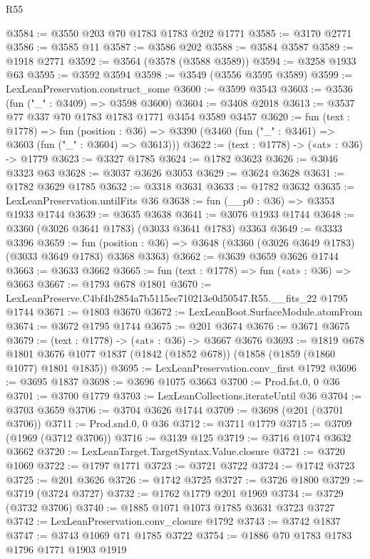 \begin{lexlean}{R55}
\begin{coremodule}
@3584 := @3550 @203 @70 @1783 @1783 @202 @1771
@3585 := @3170 @2771
@3586 := @3585 @11
@3587 := @3586 @202
@3588 := @3584 @3587
@3589 := @1918 @2771
@3592 := @3564 (@3578 (@3588 @3589))
@3594 := @3258 @1933 @63
@3595 := @3592 @3594
@3598 := @3549 (@3556 @3595 @3589)
@3599 := LexLeanPreservation.construct_some
@3600 := @3599 @3543
@3603 := @3536 (fun ("_" : @3409) => @3598 @3600)
@3604 := @3408 @2018
@3613 := @3537 @77 @337 @70 @1783 @1783 @1771 @3454 @3589 @3457
@3620 := fun (text : @1778) =>
  fun (position : @36) => @3390 (@3460 (fun ("_" : @3461) => @3603 (fun ("_" : @3604) => @3613)))
@3622 := (text : @1778) -> («at» : @36) -> @1779
@3623 := @3327 @1785
@3624 := @1782 @3623
@3626 := @3046 @3323 @63
@3628 := @3037 @3626 @3053
@3629 := @3624 @3628
@3631 := @1782 @3629 @1785
@3632 := @3318 @3631
@3633 := @1782 @3632
@3635 := LexLeanPreservation.untilFits @36
@3638 := fun (__p0 : @36) => @3353 @1933 @1744
@3639 := @3635 @3638
@3641 := @3076 @1933 @1744
@3648 := @3360 (@3026 @3641 @1783) (@3033 @3641 @1783) @3363
@3649 := @3333 @3396
@3659 := fun (position : @36) => @3648 (@3360 (@3026 @3649 @1783) (@3033 @3649 @1783) @3368 @3363)
@3662 := @3639 @3659 @3626 @1744
@3663 := @3633 @3662
@3665 := fun (text : @1778) => fun («at» : @36) => @3663
@3667 := @1793 @678 @1801
@3670 := LexLeanPreserve.C4bf4b2854a7b5115ec710213e0d50547.R55.__fits_22 @1795 @1744
@3671 := @1803 @3670
@3672 := LexLeanBoot.SurfaceModule.atomFrom
@3674 := @3672 @1795 @1744
@3675 := @201 @3674
@3676 := @3671 @3675
@3679 := (text : @1778) -> («at» : @36) -> @3667 @3676
@3693 := @1819
    @678
    @1801
    @3676
    @1077
    @1837
    (@1842 (@1852 @678))
    (@1858 (@1859 (@1860 @1077) @1801 @1835))
@3695 := LexLeanPreservation.conv_first @1792
@3696 := @3695 @1837
@3698 := @3696 @1075 @3663
@3700 := Prod.fst.{0, 0} @36
@3701 := @3700 @1779
@3703 := LexLeanCollections.iterateUntil @36
@3704 := @3703 @3659
@3706 := @3704 @3626 @1744
@3709 := @3698 (@201 (@3701 @3706))
@3711 := Prod.snd.{0, 0} @36
@3712 := @3711 @1779
@3715 := @3709 (@1969 (@3712 @3706))
@3716 := @3139 @125
@3719 := @3716 @1074 @3632 @3662
@3720 := LexLeanTarget.TargetSyntax.Value.closure
@3721 := @3720 @1069
@3722 := @1797 @1771
@3723 := @3721 @3722
@3724 := @1742 @3723
@3725 := @201 @3626
@3726 := @1742 @3725
@3727 := @3726 @1800
@3729 := @3719 (@3724 @3727)
@3732 := @1762 @1779 @201 @1969
@3734 := @3729 (@3732 @3706)
@3740 := @1885 @1071 @1073 @1785 @3631 @3723 @3727
@3742 := LexLeanPreservation.conv_closure @1792
@3743 := @3742 @1837
@3747 := @3743 @1069 @71 @1785 @3722
@3754 := @1886 @70 @1783 @1783 @1796 @1771 @1903 @1919

\end{coremodule}
\end{lexlean}
